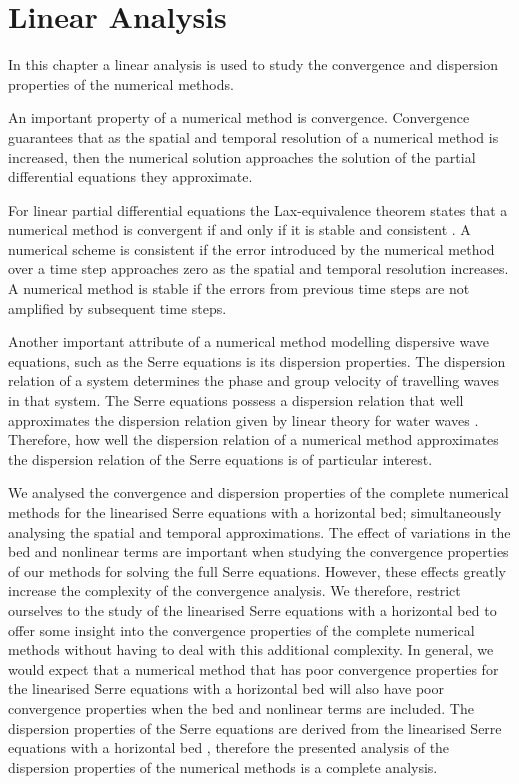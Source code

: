 \chapter{Linear Analysis}
\label{chp:AnalNumMethod}
In this chapter a linear analysis is used to study the convergence and dispersion properties of the numerical methods. 

An important property of a numerical method is convergence. Convergence guarantees that as the spatial and temporal resolution of a numerical method is increased, then the numerical solution approaches the solution of the partial differential equations they approximate. 

For linear partial differential equations the Lax-equivalence theorem states that a numerical method is convergent if and only if it is stable and consistent \cite{Lax-Richtmyer-1956-267}. A numerical scheme is consistent if the error introduced by the numerical method over a time step approaches zero as the spatial and temporal resolution increases. A numerical method is stable if the errors from previous time steps are not amplified by subsequent time steps.

Another important attribute of a numerical method modelling dispersive wave equations, such as the Serre equations is its dispersion properties. The dispersion relation of a system determines the phase and group velocity of travelling waves in that system. The Serre equations possess a dispersion relation that well approximates the dispersion relation given by linear theory for water waves \cite{Barthelemy-2004-315}. Therefore, how well the dispersion relation of a numerical method approximates the dispersion relation of the Serre equations is of particular interest.

We analysed the convergence and dispersion properties of the complete numerical methods for the linearised Serre equations with a horizontal bed; simultaneously analysing the spatial and temporal approximations. The effect of variations in the bed and nonlinear terms are important when studying the convergence properties of our methods for solving the full Serre equations. However, these effects greatly increase the complexity of the convergence analysis. We therefore, restrict ourselves to the study of the linearised Serre equations with a horizontal bed to offer some insight into the convergence properties of the complete numerical methods without having to deal with this additional complexity. In general, we would expect that a numerical method that has poor convergence properties for the linearised Serre equations with a horizontal bed will also have poor convergence properties when the bed and nonlinear terms are included. The dispersion properties of the Serre equations are derived from the linearised Serre equations with a horizontal bed \cite{Zoppou-etal-2017}, therefore the presented analysis of the dispersion properties of the numerical methods is a complete analysis.

